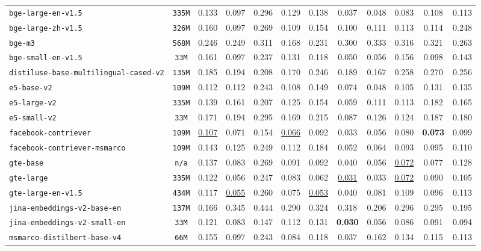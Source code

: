 \documentclass[11pt]{article}
\begin{document}
\begin{table}[htbp]
{\begin{tabular}{lccccccccccc}
\texttt{bge-large-en-v1.5} & \texttt{335M} & 0.133 & 0.097 & 0.296 & 0.129 & 0.138 & 0.037 & 0.048 & 0.083 & 0.108 & 0.113 \\
\texttt{bge-large-zh-v1.5} & \texttt{326M} & 0.160 & 0.097 & 0.269 & 0.109 & 0.154 & 0.100 & 0.111 & 0.113 & 0.114 & 0.248 \\
\texttt{bge-m3} & \texttt{568M} & 0.246 & 0.249 & 0.311 & 0.168 & 0.231 & 0.300 & 0.333 & 0.316 & 0.321 & 0.263 \\
\texttt{bge-small-en-v1.5} & \texttt{33M} & 0.161 & 0.097 & 0.237 & 0.131 & 0.118 & 0.050 & 0.056 & 0.156 & 0.098 & 0.143 \\
\texttt{distiluse-base-multilingual-cased-v2} & \texttt{135M} & 0.185 & 0.194 & 0.208 & 0.170 & 0.246 & 0.189 & 0.167 & 0.258 & 0.270 & 0.256 \\
\texttt{e5-base-v2} & \texttt{109M} & 0.112 & 0.112 & 0.243 & 0.108 & 0.149 & 0.074 & 0.048 & 0.105 & 0.131 & 0.135 \\
\texttt{e5-large-v2} & \texttt{335M} & 0.139 & 0.161 & 0.207 & 0.125 & 0.154 & 0.059 & 0.111 & 0.113 & 0.182 & 0.165 \\
\texttt{e5-small-v2} & \texttt{33M} & 0.171 & 0.194 & 0.295 & 0.169 & 0.215 & 0.087 & 0.126 & 0.124 & 0.187 & 0.180 \\
\texttt{facebook-contriever} & \texttt{109M} & \underline{0.107} & 0.071 & 0.154 & \underline{0.066} & 0.092 & 0.033 & 0.056 & 0.080 & \textbf{0.073} & 0.099 \\
\texttt{facebook-contriever-msmarco} & \texttt{109M} & 0.143 & 0.125 & 0.249 & 0.112 & 0.184 & 0.052 & 0.064 & 0.093 & 0.095 & 0.110 \\
\texttt{gte-base} & \texttt{n/a} & 0.137 & 0.083 & 0.269 & 0.091 & 0.092 & 0.040 & 0.056 & \underline{0.072} & 0.077 & 0.128 \\
\texttt{gte-large} & \texttt{335M} & 0.122 & 0.056 & 0.247 & 0.083 & 0.062 & \underline{0.031} & 0.033 & \underline{0.072} & 0.090 & 0.105 \\
\texttt{gte-large-en-v1.5} & \texttt{434M} & 0.117 & \underline{0.055} & 0.260 & 0.075 & \underline{0.053} & 0.040 & 0.081 & 0.109 & 0.096 & 0.113 \\
\texttt{jina-embeddings-v2-base-en} & \texttt{137M} & 0.166 & 0.345 & 0.444 & 0.290 & 0.324 & 0.318 & 0.206 & 0.296 & 0.295 & 0.195 \\
\texttt{jina-embeddings-v2-small-en} & \texttt{33M} & 0.121 & 0.083 & 0.147 & 0.112 & 0.131 & \textbf{0.030} & 0.056 & 0.086 & 0.091 & 0.094 \\
\texttt{msmarco-distilbert-base-v4} & \texttt{66M} & 0.155 & 0.097 & 0.243 & 0.084 & 0.118 & 0.037 & 0.162 & 0.134 & 0.115 & 0.113 \\

\end{tabular}}
\end{table}
\end{document}
